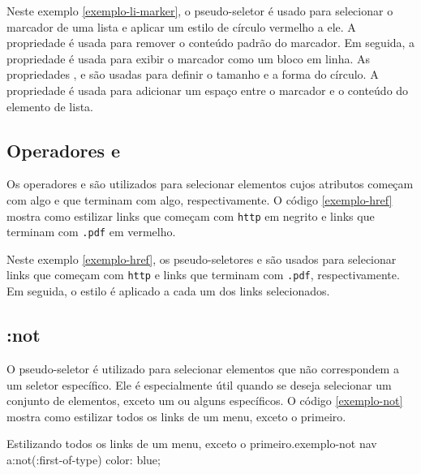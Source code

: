 Neste exemplo \ref{exemplo-li-marker}, o pseudo-seletor  é usado para selecionar o marcador de uma lista e aplicar um estilo de círculo vermelho a ele. A propriedade  é usada para remover o conteúdo padrão do marcador. Em seguida, a propriedade  é usada para exibir o marcador como um bloco em linha. As propriedades ,  e  são usadas para definir o tamanho e a forma do círculo. A propriedade  é usada para adicionar um espaço entre o marcador e o conteúdo do elemento de lista.

\subsection{Operadores \var{\textasciicircum=} e \var{\$=}}

Os operadores \var{\textasciicircum=} e \var{\$=} são utilizados para selecionar elementos cujos atributos começam com algo e que terminam com algo, respectivamente. O código \ref{exemplo-href} mostra como estilizar links que começam com \texttt{http} em negrito e links que terminam com \texttt{.pdf} em vermelho.


Neste exemplo \ref{exemplo-href}, os pseudo-seletores \var{[href\textasciicircum="http"]} e \var{[href\$=".pdf"]} são usados para selecionar links que começam com \texttt{http} e links que terminam com \texttt{.pdf}, respectivamente. Em seguida, o estilo é aplicado a cada um dos links selecionados.

\subsection{:not}

O pseudo-seletor  é utilizado para selecionar elementos que não correspondem a um seletor específico. Ele é especialmente útil quando se deseja selecionar um conjunto de elementos, exceto um ou alguns específicos. O código \ref{exemplo-not} mostra como estilizar todos os links de um menu, exceto o primeiro.

\begin{csscode}{Estilizando todos os links de um menu, exceto o primeiro.}{exemplo-not}
    nav a:not(:first-of-type) {
    color: blue;
}
\end{csscode}

